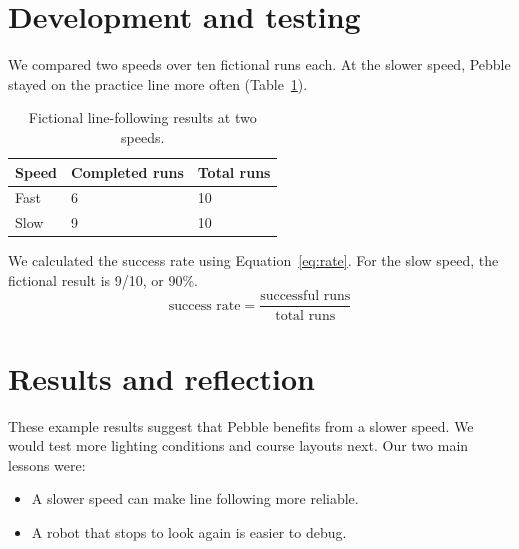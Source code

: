 \documentclass[runningheads]{llncs}
\begin{document}
\section{Development and testing}
%
We compared two speeds over ten fictional runs each. At the slower speed,
Pebble stayed on the practice line more often (Table~\ref{tab:results}).
\begin{table}[htbp]
  \caption{Fictional line-following results at two speeds.}
  \label{tab:results}
  \centering
  \begin{tabular}{lll}
    \hline
    Speed & Completed runs & Total runs \\
    \hline
    Fast & 6 & 10 \\
    Slow & 9 & 10 \\
    \hline
  \end{tabular}
\end{table}

We calculated the success rate using Equation~\ref{eq:rate}. For the slow
speed, the fictional result is 9/10, or 90\%.
\begin{equation}
  \text{success rate} = \frac{\text{successful runs}}{\text{total runs}}
  \label{eq:rate}
\end{equation}

\section{Results and reflection}
These example results suggest that Pebble benefits from a slower speed.
We would test more lighting conditions and course layouts next.
Our two main lessons were:
\begin{itemize}
  \item A slower speed can make line following more reliable.
  \item A robot that stops to look again is easier to debug.
\end{itemize}
\end{document}
